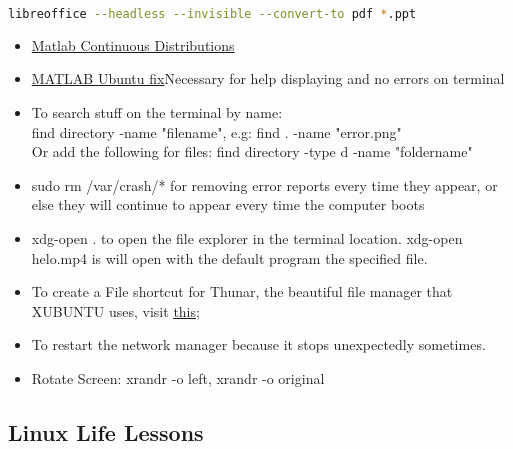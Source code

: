 \begin{lstlisting}[language=Bash, basicstyle=\footnotesize]
    libreoffice --headless --invisible --convert-to pdf *.ppt
\end{lstlisting} 
\begin{itemize}
    \item \href{ https://nl.mathworks.com/help/stats/continuous-distributions.htm}{Matlab Continuous Distributions}
    
    \item \href{https://nl.mathworks.com/support/bugreports/1765886}{MATLAB Ubuntu fix}Necessary for help displaying and no errors on terminal
    
    \item To search stuff on the terminal by name: \\ 
    find directory -name "filename", e.g: find . -name "error.png"\\
    Or add the following for files: find directory -type d -name "foldername"
    
    \item sudo rm /var/crash/* \hspace{1cm}   for removing error reports every time they appear, or else they will continue to appear every time the computer boots
    
    \item xdg-open . \hspace{1cm} to open the file explorer in the terminal location. xdg-open helo.mp4  \hspace{.5cm} is will open with the default program the specified file.
    
    \item To create a File shortcut for Thunar, the beautiful file manager that XUBUNTU uses, visit \href{https://forum.xfce.org/viewtopic.php?id=9711}{\uline{this}};
    
    \item {} \hspace{1cm} To restart the network manager because it stops unexpectedly sometimes.
    
    \item Rotate Screen: xrandr -o left, xrandr -o original

\end{itemize}





\subsection{Linux Life Lessons}

